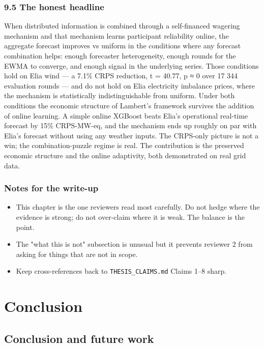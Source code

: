\documentclass[11pt,a4paper,openany]{report}
\begin{document}
\section{9.5 The honest headline}

When distributed information is combined through a self-financed
wagering mechanism and that mechanism learns participant reliability
online, the aggregate forecast improves vs uniform in the conditions
where any forecast combination helps: enough forecaster heterogeneity,
enough rounds for the EWMA to converge, and enough signal in the
underlying series. Those conditions hold on Elia wind — a 7.1\% CRPS
reduction, t = 40.77, p ≈ 0 over 17 344 evaluation rounds — and do not
hold on Elia electricity imbalance prices, where the mechanism is
statistically indistinguishable from uniform. Under both conditions
the economic structure of Lambert's framework survives the addition
of online learning. A simple online XGBoost beats Elia's operational
real-time forecast by 15\% CRPS-MW-eq, and the mechanism ends up
roughly on par with Elia's forecast without using any weather inputs.
The CRPS-only picture is not a win; the combination-puzzle regime is
real. The contribution is the preserved economic structure and the
online adaptivity, both demonstrated on real grid data.

\section{Notes for the write-up}

\begin{itemize}
  \item This chapter is the one reviewers read most carefully. Do not
    hedge where the evidence is strong; do not over-claim where it is
    weak. The balance is the point.
  \item The "what this is not" subsection is unusual but it prevents
    reviewer 2 from asking for things that are not in scope.
  \item Keep cross-references back to \texttt{THESIS\_CLAIMS.md} Claims 1–8
    sharp.
\end{itemize}

\part*{Conclusion}
\chapter{Conclusion and future work}
\end{document}
